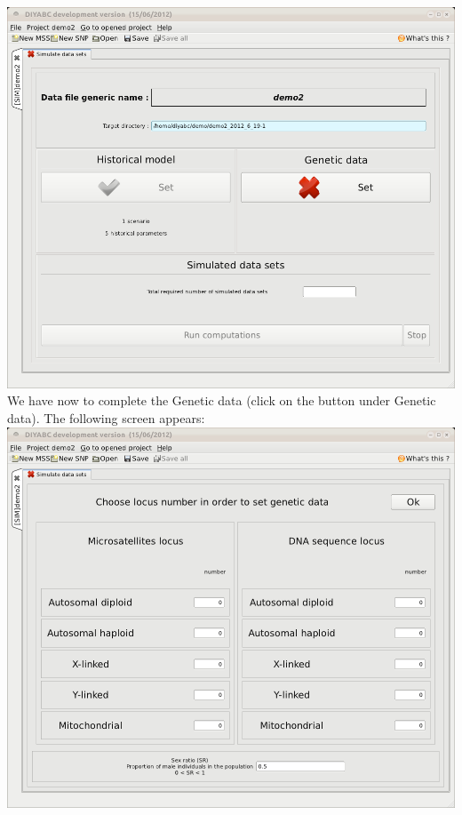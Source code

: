 \includegraphics[scale=0.33]{gui_pictures/Capture-DIYABC-70.png} \\


We have now to complete the Genetic data (click on the  button under \textsf{Genetic data}). The following screen appears:\\

\includegraphics[scale=0.33]{gui_pictures/Capture-DIYABC-71.png} \\

